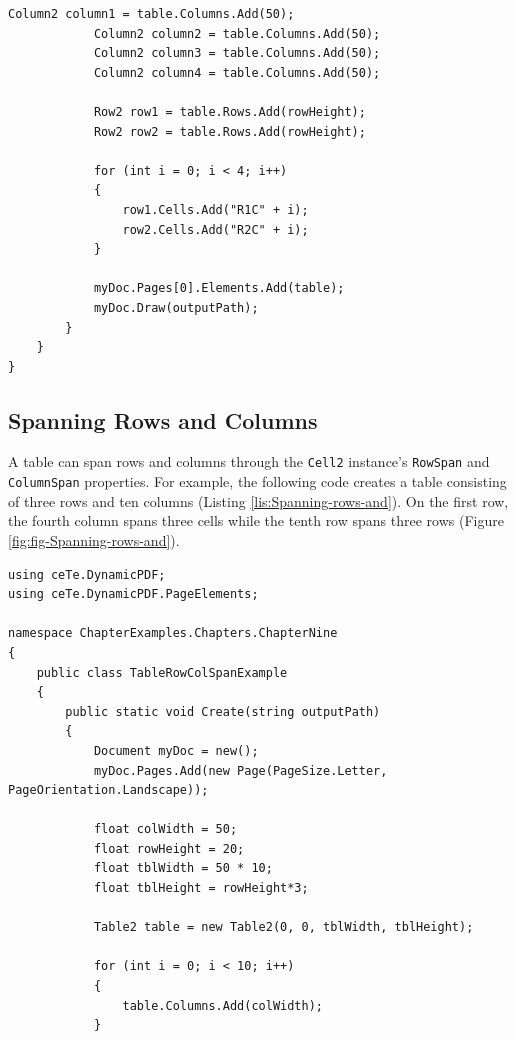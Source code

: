 \documentclass[american,letterpaper]{tufte-book}
\numberwithin{equation}{section}
\numberwithin{figure}{section}
\begin{document}
{\begin{lstlisting}[caption={A simple table example.},label={lis:A-simple-table},basicstyle={\small\ttfamily},breaklines=true]
            Column2 column1 = table.Columns.Add(50);
            Column2 column2 = table.Columns.Add(50);
            Column2 column3 = table.Columns.Add(50);
            Column2 column4 = table.Columns.Add(50);

            Row2 row1 = table.Rows.Add(rowHeight);
            Row2 row2 = table.Rows.Add(rowHeight);

            for (int i = 0; i < 4; i++)
            {
                row1.Cells.Add("R1C" + i);
                row2.Cells.Add("R2C" + i);
            }

            myDoc.Pages[0].Elements.Add(table);
            myDoc.Draw(outputPath);
        }
    }
}
\end{lstlisting}
\leavevmode\egroup


\subsection{Spanning Rows and Columns}

A table can span rows and columns through the \texttt{Cell2} instance's
\texttt{RowSpan} and \texttt{ColumnSpan} properties. For example,
the following code creates a table consisting of three rows and ten
columns (Listing \ref{lis:Spanning-rows-and}). On the first row,
the fourth column spans three cells while the tenth row spans three
rows (Figure \ref{fig:fig-Spanning-rows-and}).

\bgroup{}
\begin{lstlisting}[caption={Spanning rows and columns.},label={lis:Spanning-rows-and},basicstyle={\small\ttfamily},breaklines=true]
using ceTe.DynamicPDF;
using ceTe.DynamicPDF.PageElements;

namespace ChapterExamples.Chapters.ChapterNine
{
    public class TableRowColSpanExample
    {
        public static void Create(string outputPath)
        {
            Document myDoc = new();
            myDoc.Pages.Add(new Page(PageSize.Letter, PageOrientation.Landscape));

            float colWidth = 50;
            float rowHeight = 20;
            float tblWidth = 50 * 10;
            float tblHeight = rowHeight*3;

            Table2 table = new Table2(0, 0, tblWidth, tblHeight);
           
            for (int i = 0; i < 10; i++)
            {
                table.Columns.Add(colWidth);
            }


\end{lstlisting}}
\end{document}

